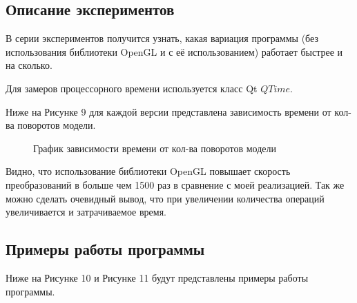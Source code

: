 \documentclass[14pt, a4paper]{extarticle}
\begin{document}
	\subsection{Описание экспериментов}
	В серии экспериментов получится узнать, какая вариация программы (без использования библиотеки OpenGL и с её использованием) работает быстрее и на сколько.\par
	Для замеров процессорного времени используется класс Qt $QTime$.\par
	Ниже на Рисунке 9 для каждой версии представлена зависимость времени от кол-ва поворотов модели.\par  
	\begin{figure}[h!]
		\caption{График зависимости времени от кол-ва поворотов модели}
	\end{figure}
	  
	Видно, что использование библиотеки OpenGL повышает скорость преобразований в больше чем 1500 раз в сравнение с моей реализацией. Так же можно сделать очевидный вывод, что при увеличении количества операций увеличивается и затрачиваемое время.
	

	\subsection{Примеры работы программы}
	Ниже на Рисунке 10 и Рисунке 11 будут представлены примеры работы программы.
	
\end{document}
